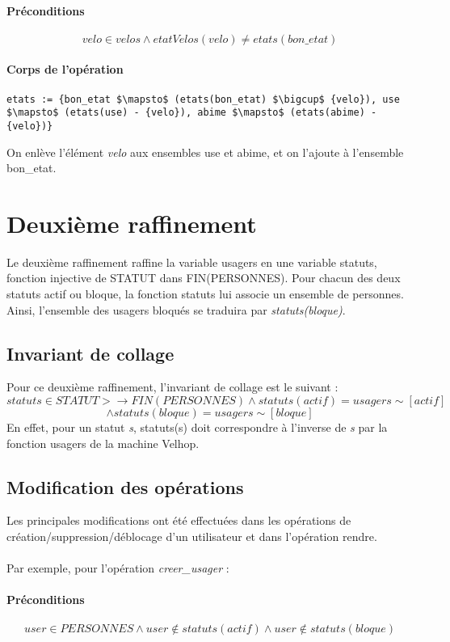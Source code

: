\documentclass[12pt]{article}
\begin{document}
\paragraph{Préconditions}
\[ velo \in velos \land etatVelos(velo) \neq etats(bon\_etat) \]
\paragraph{Corps de l'opération}
\textbf{}
\begin{lstlisting}[mathescape]
  etats := {bon_etat $\mapsto$ (etats(bon_etat) $\bigcup$ {velo}), use $\mapsto$ (etats(use) - {velo}), abime $\mapsto$ (etats(abime) - {velo})}
\end{lstlisting}
On enlève l'élément \textit{velo} aux ensembles use et abime, et on l'ajoute à l'ensemble bon\_etat.
\newpage
\section{Deuxième raffinement}
Le deuxième raffinement raffine la variable usagers en une variable statuts, fonction injective de STATUT dans FIN(PERSONNES). Pour chacun des deux statuts actif ou bloque, la fonction statuts lui associe un ensemble de personnes. Ainsi, l'ensemble des usagers bloqués se traduira par \textit{statuts(bloque)}.
\subsection{Invariant de collage}
Pour ce deuxième raffinement, l'invariant de collage est le suivant : \\
\[ statuts \in STATUT >\rightarrow FIN(PERSONNES) \land statuts(actif) = usagers\sim[{actif}] \]
\[ \land statuts(bloque) = usagers\sim[{bloque}] \]
En effet, pour un statut \textit{s}, statuts(s) doit correspondre à l'inverse de \textit{s} par la fonction usagers de la machine Velhop.
\subsection{Modification des opérations}
Les principales modifications ont été effectuées dans les opérations de création/suppression/déblocage d’un utilisateur et dans l’opération rendre. \\ \\
Par exemple, pour l'opération \textit{creer\_usager} :
\paragraph{Préconditions}
\[user \in PERSONNES \land user \notin statuts(actif) \land user \notin statuts(bloque)\]
\end{document}
